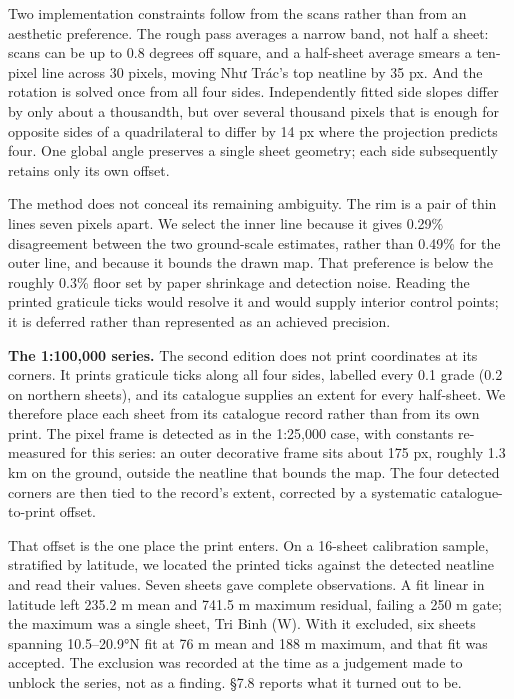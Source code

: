 \documentclass[11pt,a4paper]{article}
\begin{document}
Two implementation constraints follow from the scans rather than from an aesthetic preference. The rough pass averages a narrow band, not half a sheet: scans can be up to 0.8 degrees off square, and a half-sheet average smears a ten-pixel line across 30 pixels, moving Như Trác's top neatline by 35 px. And the rotation is solved once from all four sides. Independently fitted side slopes differ by only about a thousandth, but over several thousand pixels that is enough for opposite sides of a quadrilateral to differ by 14 px where the projection predicts four. One global angle preserves a single sheet geometry; each side subsequently retains only its own offset.

The method does not conceal its remaining ambiguity. The rim is a pair of thin lines seven pixels apart. We select the inner line because it gives 0.29\% disagreement between the two ground-scale estimates, rather than 0.49\% for the outer line, and because it bounds the drawn map. That preference is below the roughly 0.3\% floor set by paper shrinkage and detection noise. Reading the printed graticule ticks would resolve it and would supply interior control points; it is deferred rather than represented as an achieved precision.

\textbf{The 1:100,000 series.} The second edition does not print coordinates at its corners. It prints graticule ticks along all four sides, labelled every 0.1 grade (0.2 on northern sheets), and its catalogue supplies an extent for every half-sheet. We therefore place each sheet from its catalogue record rather than from its own print. The pixel frame is detected as in the 1:25,000 case, with constants re-measured for this series: an outer decorative frame sits about 175 px, roughly 1.3 km on the ground, outside the neatline that bounds the map. The four detected corners are then tied to the record's extent, corrected by a systematic catalogue-to-print offset.

That offset is the one place the print enters. On a 16-sheet calibration sample, stratified by latitude, we located the printed ticks against the detected neatline and read their values. Seven sheets gave complete observations. A fit linear in latitude left 235.2 m mean and 741.5 m maximum residual, failing a 250 m gate; the maximum was a single sheet, Tri Binh (W). With it excluded, six sheets spanning 10.5–20.9°N fit at 76 m mean and 188 m maximum, and that fit was accepted. The exclusion was recorded at the time as a judgement made to unblock the series, not as a finding. §7.8 reports what it turned out to be.
\end{document}
